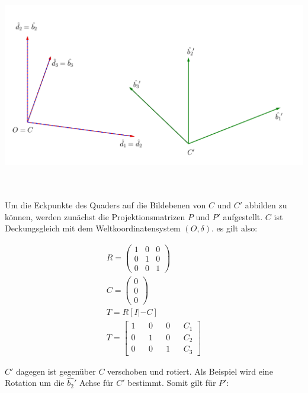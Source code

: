 \begin{minipage}{\linewidth}
	\centering
	\includegraphics[width=.6\linewidth]{images/KS_Minimalbeispiel_beschriftet.png}
	\label{fig:KoordsystemeMinimal}
\end{minipage}\\ \\

%
Um die Eckpunkte des Quaders auf die Bildebenen von $C$ und $C'$ abbilden zu können, werden zunächst die Projektionsmatrizen $P$ und $P'$ aufgestellt. $C$ ist Deckungsgleich mit dem Weltkoordinatensystem $(O,\delta)$. es gilt also:

\begin{gather}
R=\begin{pmatrix}
1&0&0\\
0&1&0\\
0&0&1
\end{pmatrix}\\
C=\begin{pmatrix}
0\\0\\0
\end{pmatrix}\\
T = R[I|-C]\\
T = \begin{bmatrix}
1&&0&&0&&C_1\\
0&&1&&0&&C_2\\
0&&0&&1&&C_3
\end{bmatrix}
\end{gather} 

$C'$ dagegen ist gegenüber $C$ verschoben und rotiert. Als Beispiel wird eine Rotation um die $\hat{b_2}'$ Achse für $C'$ bestimmt. Somit gilt für $P'$:


